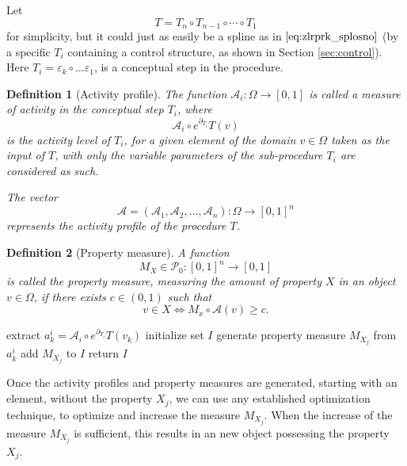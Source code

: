 \documentclass{article}
\newcommand{\dP}{\mathcal{P}}
\newcommand{\D}{\partial}
\newtheorem{definicija}{Definition}[section]
\begin{document}
   Let 
   $$T=T_n\circ T_{n-1}\circ\cdots\circ T_1$$
   for simplicity, but it could just as easily be a spline as in $\eqref{eq:zlrprk_splosno}$ (by a specific $T_i$ containing a control structure, as shown in Section \ref{sec:control}). Here $T_i=\varepsilon_k\circ\ldots \varepsilon_1$, is a conceptual step in the procedure.
  
   
   \begin{definicija}[Activity profile]
   The function $\mathcal{A}_i:\Omega\to[0,1]$ is called a \emph{measure of activity} in the conceptual step $T_i$, where 
   $$\mathcal{A}_i\circ e^{\D_{T_i}}T(v)$$ 
   is the \emph{activity level} of $T_i$, for a given element of the domain $v\in \Omega$ taken as the input of $T$, with only the variable parameters of the sub-procedure $T_i$ are considered as such.
   
   The vector $$\mathcal{A}=(\mathcal{A}_1,\mathcal{A}_2,\dots,\mathcal{A}_n):\Omega\to[0,1]^n$$ represents the activity profile of the procedure $T$. 
   \end{definicija}
   
   
   \begin{definicija}[Property measure]
    A function 
    $$M_X\in\dP_0:[0,1]^n\to[0,1]$$  
    is called the property measure, measuring the amount of property $X$ in an object $v\in\Omega$, if there exists  $c\in(0,1)$ such that 
    $$v\in X\iff M_x\circ\mathcal{A}(v)\ge c.$$
    \end{definicija}
   
   \begin{algorithm}[ht!]
   \caption{Construct property measure}
   \label{alg:propertyMeasure}
   \begin{algorithmic}[1]
   \State extract $a^i_k=\mathcal{A}_i\circ e^{\D_{T_i}}T(v_k)$
	\EndFor
	\EndFor
	\State initialize set $I$
   \State generate property measure $M_{X_j}$ from $a^i_k$
   \State add $M_{X_j}$ to $I$
   \EndFor
   \State return $I$
   \EndProcedure
   \end{algorithmic}
   \end{algorithm}
   
   Once the activity profiles and property measures are generated, starting with an element, without the property $X_j$, we can use any established optimization technique, to optimize and increase the measure $M_{X_j}$. When the increase of the measure $M_{X_j}$ is sufficient, this results in an new object possessing the property $X_j$.
   
\end{document}
